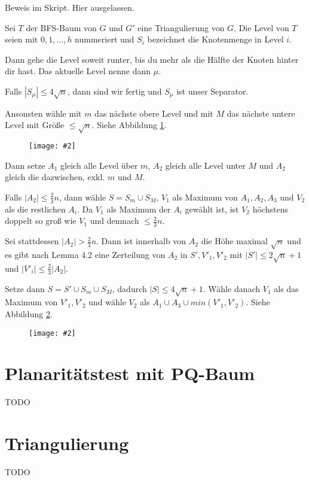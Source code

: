 \documentclass[10pt,a4paper]{article}
\makeatletter
\def\maxwidth#1{\ifdim\Gin@nat@width>#1 #1\else\Gin@nat@width\fi}
\newcommand{\imageFigure}[4]{%
    \begin{figure}[h]%
        \centering%
        {%
            \setlength{\fboxsep}{1pt}%
            \setlength{\fboxrule}{1pt}%
            \texttt{[image: \#2]}%
        }%
        \caption{#1}%
        \label{fig:#4}%
    \end{figure}%
}
\makeatother
\begin{document}
Beweis im Skript.
Hier ausgelassen.

Sei $T$ der BFS-Baum von $G$ und $G'$ eine Triangulierung von $G$.
Die Level von $T$ seien mit $0,1,\dots,h$ nummeriert und $S_i$ bezeichnet die
Knotenmenge in Level $i$.

Dann gehe die Level soweit runter, bis du mehr als die Hälfte der Knoten hinter
dir hast.
Das aktuelle Level nenne dann $\mu$.

Falls $|S_\mu| \leq 4\sqrt{n}$, dann sind wir fertig und $S_\mu$ ist unser
Separator.

Ansonsten wähle mit $m$ das nächste obere Level und mit $M$ das nächste untere
Level mit Größe $\leq \sqrt{n}$.
Siehe Abbildung \ref{fig:pst-levels}.

\imageFigure{}{pst-levels.png}{.8}{pst-levels}

Dann setze $A_1$ gleich alle Level über $m$, $A_2$ gleich alle Level unter $M$
und $A_2$ gleich die dazwischen, exkl. $m$ und $M$.

Falls $|A_2| \leq \frac{2}{3}n$, dann wähle $S = S_m \cup S_M$, $V_1$ als
Maximum von $A_1, A_2, A_3$ und $V_2$ als die restlichen $A_i$.
Da $V_1$ als Maximum der $A_i$ gewählt ist, ist $V_2$ höchstens doppelt so groß
wie $V_1$ und demnach $\leq \frac{2}{3}n$.

Sei stattdessen $|A_2| > \frac{2}{3}n$.
Dann ist innerhalb von $A_2$ die Höhe maximal $\sqrt{n}$ und es gibt nach Lemma
4.2 eine Zerteilung von $A_2$ in $S', V'_1, V'_2$ mit $|S'| \leq 2\sqrt{n}+1$
und $|V'_i| \leq \frac{2}{3}|A_2|$.

Setze dann $S = S' \cup S_m \cup S_M$, dadurch $|S| \leq 4\sqrt{n}+1$.
Wähle danach $V_1$ als das Maximum von $V'_1, V'_2$ und wähle $V_2$ als $A_1
\cup A_3 \cup min(V'_1, V'_2)$.
Siehe Abbildung \ref{fig:pst-final}.


\imageFigure{}{pst-final.png}{.95}{pst-final}



\clearpage
\section{Planaritätstest mit PQ-Baum}
TODO %


\clearpage
\section{Triangulierung}
TODO %
\end{document}
